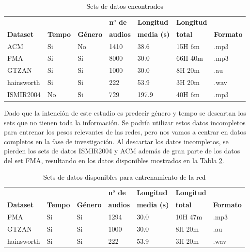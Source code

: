 \begin{table}
\centering
\begin{tabular}{lllllll}
\hline
\textbf{ } & \textbf{ } & \textbf{ } & \textbf{n$^o$ de} & \textbf{Longitud} & \textbf{Longitud} & \textbf{}\\ 
\textbf{Dataset} & \textbf{Tempo} & \textbf{Género} & \textbf{audios} & \textbf{media (s)} & \textbf{total} & \textbf{Formato}\\ \hline
ACM              & Si			  &		No	   &		1410			  &			38.6	 		&  		 15H 6m 	 	  &  		.mp3  \\
FMA              & Si			  &		Si	   &		8000			  &			30.0	 		&  		 66H 40m	 	  &  		.mp3\\
GTZAN            & Si			  &		Si	   &		1000			  &			30.0	 		&  		 8H 20m 	 	  &  		.au\\
hainsworth       & Si			  &		Si	   &		222				  &			53.9	 		&  		 3H 20m 	 	  &  		.wav \\
ISMIR2004        & No		  &		Si	   &		729				      &			197.9	 		&  		 40H 6m 	 	  &  		.mp3 \\ \hline
\end{tabular}
\caption{\textcolor{black}{Sets de datos encontrados}}
\label{tab:data_sources}
\end{table}

Dado que la intención de este estudio es predecir género y tempo se descartan los sets que no tienen toda la información. Se podría utilizar estos datos incompletos para entrenar los pesos relevantes de las redes, pero nos vamos a centrar en datos completos en la fase de investigación. Al descartar los datos incompletos, se pierden los sets de datos ISMIR2004 y ACM además de gran parte de los datos del set FMA, resultando en los datos disponibles mostrados en la Tabla \ref{tab:data_sources_filtered}.

\begin{table}
\centering
\begin{tabular}{lllllll}
\hline
\textbf{ } & \textbf{ } & \textbf{ } & \textbf{n$^o$ de} & \textbf{Longitud} & \textbf{Longitud} & \textbf{}\\ 
\textbf{Dataset} & \textbf{Tempo} & \textbf{Género} & \textbf{audios} & \textbf{media (s)} & \textbf{total} & \textbf{Formato}\\ \hline
FMA              & Si			  &		Si	   &		1294			  &			30.0	 		&  		 10H 47m	 	  &  		.mp3\\
GTZAN            & Si			  &		Si	   &		1000			  &			30.0	 		&  		 8H 20m 	 	  &  		.au\\
hainsworth       & Si			  &		Si	   &		222				  &			53.9	 		&  		 3H 20m 	 	  &  		.wav \\ \hline
\end{tabular}
\caption{\textcolor{black}{Sets de datos disponibles para entrenamiento de la red}}
\label{tab:data_sources_filtered}
\end{table}

